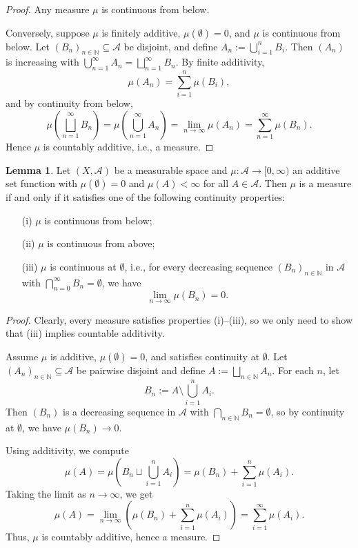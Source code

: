 \documentclass{article}
\theoremstyle{definition}
\newtheorem{lemma}[theorem]{Lemma}
\begin{document}
\begin{proof}
Any measure \(\mu\) is continuous from below.

Conversely, suppose \(\mu\) is finitely additive, \(\mu(\emptyset) = 0\), and \(\mu\) is continuous from below. Let \((B_n)_{n \in \mathbb{N}} \subseteq \mathcal{A}\) be disjoint, and define \(A_n := \bigcup_{i=1}^n B_i\). Then \((A_n)\) is increasing with \(\bigcup_{n=1}^\infty A_n = \bigsqcup_{n=1}^\infty B_n\). By finite additivity,
\[
\mu(A_n) = \sum_{i=1}^n \mu(B_i),
\]
and by continuity from below,
\[
\mu\left(\bigsqcup_{n=1}^\infty B_n\right) = \mu\left(\bigcup_{n=1}^\infty A_n\right) = \lim_{n \to \infty} \mu(A_n) = \sum_{n=1}^\infty \mu(B_n).
\]
Hence \(\mu\) is countably additive, i.e., a measure.
\end{proof}


\medskip
\begin{lemma}
Let \((X, \mathcal{A})\) be a measurable space and \(\mu : \mathcal{A} \to [0, \infty)\) an additive set function with \(\mu(\emptyset) = 0\) and \(\mu(A) < \infty\) for all \(A \in \mathcal{A}\). Then \(\mu\) is a measure if and only if it satisfies one of the following continuity properties:

\begin{enumerate}
  \item[(i)] \(\mu\) is continuous from below;
  \item[(ii)] \(\mu\) is continuous from above;
  \item[(iii)] \(\mu\) is continuous at \(\emptyset\), i.e., for every decreasing sequence \((B_n)_{n \in \mathbb{N}}\) in \(\mathcal{A}\) with \(\bigcap_{n=0}^\infty B_n = \emptyset\), we have
  \[
    \lim_{n \to \infty} \mu(B_n) = 0.
  \]
\end{enumerate}
\end{lemma}

\begin{proof}
Clearly, every measure satisfies properties (i)–(iii), so we only need to show that (iii) implies countable additivity.

Assume \(\mu\) is additive, \(\mu(\emptyset) = 0\), and satisfies continuity at \(\emptyset\). Let \((A_n)_{n \in \mathbb{N}} \subseteq \mathcal{A}\) be pairwise disjoint and define \(A := \bigsqcup_{n \in \mathbb{N}} A_n\). For each \(n\), let
\[
B_n := A \setminus \bigcup_{i=1}^n A_i.
\]
Then \((B_n)\) is a decreasing sequence in \(\mathcal{A}\) with \(\bigcap_{n \in \mathbb{N}} B_n = \emptyset\), so by continuity at \(\emptyset\), we have \(\mu(B_n) \to 0\).

Using additivity, we compute
\[
\mu(A) = \mu\left(B_n \sqcup \bigcup_{i=1}^n A_i\right) = \mu(B_n) + \sum_{i=1}^n \mu(A_i).
\]
Taking the limit as \(n \to \infty\), we get
\[
\mu(A) = \lim_{n \to \infty} \left( \mu(B_n) + \sum_{i=1}^n \mu(A_i) \right) = \sum_{i=1}^\infty \mu(A_i).
\]
Thus, \(\mu\) is countably additive, hence a measure.
\end{proof}
\end{document}
